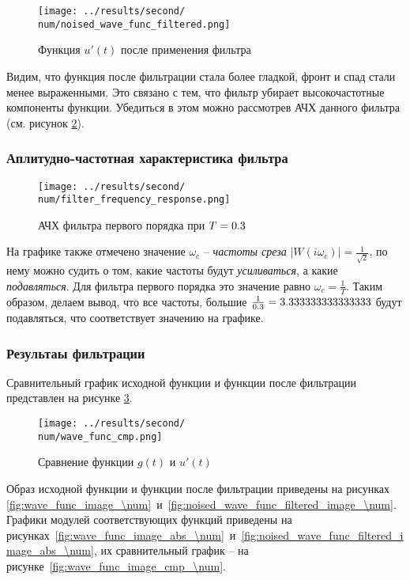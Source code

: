 \begin{figure}[ht!]
    \centering
    \texttt{[image: ../results/second/\\num/noised\_wave\_func\_filtered.png]}
    \caption{Функция $u'(t)$ после применения фильтра}
    \label{fig:noised_wave_func_filtered_\num}
\end{figure}

Видим, что функция после фильтрации стала более гладкой, фронт и спад стали менее выраженными. 
Это связано с тем, что фильтр убирает высокочастотные компоненты функции. Убедиться в этом можно 
рассмотрев АЧХ данного фильтра (см. рисунок \ref{fig:filter_frequency_response_\num}).

\FloatBarrier
\subsubsection{Аплитудно-частотная характеристика фильтра}
\begin{figure}[ht!]
    \centering
    \texttt{[image: ../results/second/\\num/filter\_frequency\_response.png]}
    \caption{АЧХ фильтра первого порядка при $T = 0.3$}
    \label{fig:filter_frequency_response_\num}
\end{figure}

На графике также отмечено значение $\omega_c$ -- \textit{частоты среза} $|W(i\omega_c)| = \frac{1}{\sqrt{2}}$, по нему можно судить о том, какие частоты будут \textit{усиливаться}, а какие \textit{подавляться}. 
Для фильтра первого порядка это значение равно $\omega_c = \frac{1}{T}$. Таким образом, делаем вывод, что все частоты, 
большие $\frac{1}{\T} = \fpeval{1/ \T}$ будут подавляться, что соответствует значению на графике. 

\FloatBarrier
\subsubsection{Результаы фильтрации}
Сравнительный график исходной функции и функции после фильтрации представлен на рисунке \ref{fig:wave_func_cmp_\num}.

\begin{figure}[ht!]
    \centering
    \texttt{[image: ../results/second/\\num/wave\_func\_cmp.png]}
    \caption{Сравнение функции $g(t)$ и $u'(t)$}
    \label{fig:wave_func_cmp_\num}
\end{figure}

Образ исходной функции и функции после фильтрации приведены на рисунках \ref{fig:wave_func_image_\num}~и~\ref{fig:noised_wave_func_filtered_image_\num}.
Графики модулей соответствующих функций приведены на рисунках~\ref{fig:wave_func_image_abs_\num}~и~\ref{fig:noised_wave_func_filtered_image_abs_\num}, их 
сравнительный график -- на рисунке~\ref{fig:wave_func_image_cmp_\num}.

